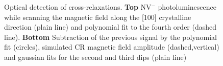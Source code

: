 \documentclass[9pt,twocolumn,twoside]{osajnl}
\begin{document}
\begin{figure}[htbp]
\centering
{}
\caption{Optical detection of cross-relaxations. \textbf{Top} NV$^-$ photoluminescence while scanning the magnetic field along the [100] crystalline direction (plain line) and polynomial fit to the fourth order (dashed line). \textbf{Bottom} Subtraction of the previous signal by the polynomial fit (circles), simulated CR magnetic field amplitude (dashed,vertical) and gaussian fits for the second and third dips (plain line)}
\label{scan}
\end{figure}
\end{document}
